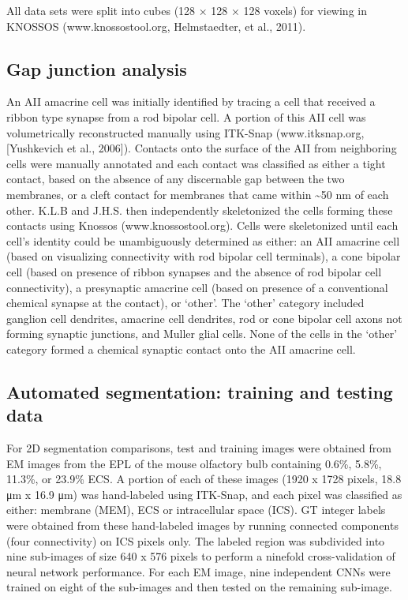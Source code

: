 \documentclass{article}
\begin{document}
All data sets were split into cubes (128 × 128 × 128 voxels) for viewing in KNOSSOS (www.knossostool.org, Helmstaedter, et al., 2011).

\subsection*{Gap junction analysis}

An AII amacrine cell was initially identified by tracing a cell that received a ribbon type synapse from a rod bipolar cell. A portion of this AII cell was volumetrically reconstructed manually using ITK-Snap (www.itksnap.org, [Yushkevich et al., 2006]). Contacts onto the surface of the AII from neighboring cells were manually annotated and each contact was classified as either a tight contact, based on the absence of any discernable gap between the two membranes, or a cleft contact for membranes that came within \textasciitilde50 nm of each other. K.L.B and J.H.S. then independently skeletonized the cells forming these contacts using Knossos (www.knossostool.org). Cells were skeletonized until each cell’s identity could be unambiguously determined as either: an AII amacrine cell (based on visualizing connectivity with rod bipolar cell terminals), a cone bipolar cell (based on presence of ribbon synapses and the absence of rod bipolar cell connectivity), a presynaptic amacrine cell (based on presence of a conventional chemical synapse at the contact), or ‘other’. The ‘other’ category included ganglion cell dendrites, amacrine cell dendrites, rod or cone bipolar cell axons not forming synaptic junctions, and Muller glial cells. None of the cells in the ‘other’ category formed a chemical synaptic contact onto the AII amacrine cell.

\subsection*{Automated segmentation: training and testing data}

For 2D segmentation comparisons, test and training images were obtained from EM images from the EPL of the mouse olfactory bulb containing 0.6\%, 5.8\%, 11.3\%, or 23.9\% ECS. A portion of each of these images (1920 x 1728 pixels, 18.8 μm x 16.9 μm) was hand-labeled using ITK-Snap, and each pixel was classified as either: membrane (MEM), ECS or intracellular space (ICS). GT integer labels were obtained from these hand-labeled images by running connected components (four connectivity) on ICS pixels only. The labeled region was subdivided into nine sub-images of size 640 x 576 pixels to perform a ninefold cross-validation of neural network performance. For each EM image, nine independent CNNs were trained on eight of the sub-images and then tested on the remaining sub-image.
\end{document}
